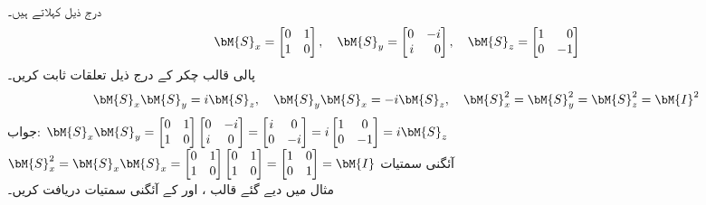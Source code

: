 \quad {} \\
درج ذیل  کہلاتے ہیں۔
\begin{align}
\bM{S}_x=\begin{bmatrix*}[r] 0&1\\1&0 \end{bmatrix*},\quad \bM{S}_y=\begin{bmatrix*}[r] 0&-i\\i&0 \end{bmatrix*},\quad \bM{S}_z=\begin{bmatrix*}[r] 1&0\\0&-1 \end{bmatrix*}
\end{align}
پالی قالب چکر کے درج ذیل تعلقات ثابت کریں۔
\begin{align}
\bM{S}_x\bM{S}_y=i\bM{S}_z,\quad \bM{S}_y\bM{S}_x=-i\bM{S}_z,\quad \bM{S}_x^2=\bM{S}_y^2=\bM{S}_z^2=\bM{I}^2
\end{align}
جواب:
$\bM{S}_x\bM{S}_y=\begin{bmatrix} 0&1\\1&0 \end{bmatrix}\begin{bmatrix} 0&-i\\i&0 \end{bmatrix}=\begin{bmatrix} i&0\\0&-i \end{bmatrix}=i\begin{bmatrix} 1&0\\0&-1\end{bmatrix}=i\bM{S}_z$\\
$\bM{S}_x^2=\bM{S}_x\bM{S}_x=\begin{bmatrix}0&1\\1&0  \end{bmatrix}\begin{bmatrix}0&1\\1&0  \end{bmatrix}=\begin{bmatrix}1&0\\0&1  \end{bmatrix}=\bM{I}$
\quad آئگنی سمتیات\\
مثال  میں دیے گئے قالب ،  اور  کے آئگنی سمتیات دریافت کریں۔

